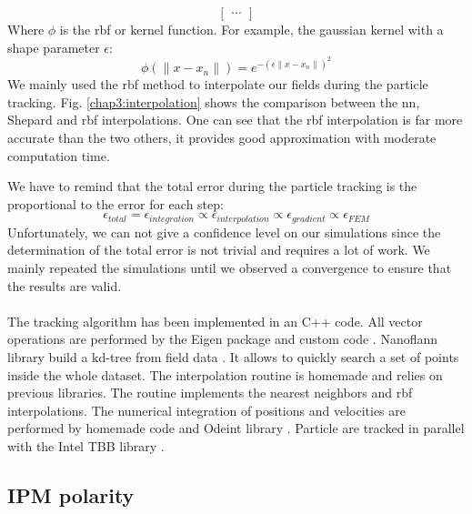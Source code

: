 \begin{refsection}
\begin{equation}
\begin{bmatrix}
			\cdots
		\end{bmatrix}
	\end{equation}
	Where $\phi$ is the \acrshort{rbf} or kernel function. For example, the gaussian kernel with a shape parameter $\epsilon$:
	\begin{equation}
		\phi(\lVert x - x_{n}\rVert) = e^{-(\epsilon\lVert x - x_{n}\rVert)^{2}}
	\end{equation}
	We mainly used the \acrshort{rbf} method to interpolate our fields during the particle tracking. Fig. \ref{chap3:interpolation} shows the comparison between the \acrshort{nn}, Shepard and \acrshort{rbf} interpolations. One can see that the \acrshort{rbf} interpolation is far more accurate than the two others, it provides good approximation with moderate computation time.

	We have to remind that the total error during the particle tracking is the
	proportional to the error for each step:
	\begin{equation}
		\epsilon_{total} = \epsilon_{integration}\propto\epsilon_{interpolation}\propto\epsilon_{gradient}\propto\epsilon_{FEM}
	\end{equation}
	Unfortunately, we can not give a confidence level on our simulations since the determination of the total error is not trivial and requires a lot of work.
	We mainly repeated the simulations until we observed a convergence to ensure that the results are valid.


	

	\paragraph{}
	The tracking algorithm has been implemented in an C++ code. All vector operations are performed by the Eigen package and custom code \cite{eigenweb}. Nanoflann library build a kd-tree from field data \cite{blanco2014nanoflann}. It allows to quickly search a set of points inside the whole dataset. The interpolation routine is homemade and relies on previous libraries. The routine implements the nearest neighbors and \acrshort{rbf} interpolations. The numerical integration of positions and velocities are performed by homemade code and Odeint library \cite{Ahnert2011,Mulansky2014}. Particle are tracked in parallel with the Intel TBB library \cite{tbb2019}.

	\subsection{IPM polarity}


\end{refsection}
